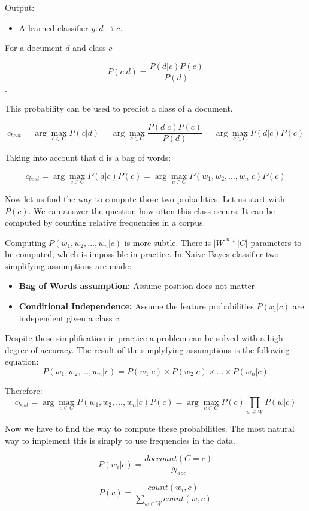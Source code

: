 \documentclass[12pt]{report}
\begin{document}
Output: 
\begin{itemize}
  \item A learned classifier $y: d \rightarrow c$.
\end{itemize}

For a document $d$ and class $c$

$$P(c | d) = \dfrac{P(d | c) P(c)}{P(d)}$$.

This probability can be used to predict a class of a document.

$$c_{best} = \arg\!\max_{c \in C} P(c | d) = \arg\!\max_{c \in C} \dfrac{P(d | c) P(c)}{P(d)} = \arg\!\max_{c \in C} {P(d | c) P(c)}$$

Taking into account that d is a bag of words:

$$c_{best} = \arg\!\max_{c \in C} {P(d | c) P(c)} = \arg\!\max_{c \in C} {P(w_1, w_2,..., w_n | c) P(c)}$$

Now let us find the way to compute those two probailities. Let us start with $P(c)$. We can answer the question how often this class occurs. It can be computed by counting relative frequencies in a corpus.

Computing $P(w_1, w_2,..., w_n | c)$ is more subtle. There is $|W|^n * |C|$ parameters to be computed, which is impossible in practice. In Naive Bayes classifier two simplifying assumptions are made:

\begin{itemize}
  \item \textbf{Bag of Words assumption:} Assume position does not matter
  \item \textbf{Conditional Independence:} Assume the feature probabilities $P(x_i | c)$ are independent given a class c.
\end{itemize}

Despite these simplification in practice a problem can be solved with a high degree of accuracy. The result of the simplyfying assumptions is the following equation:
$$P(w_1, w_2,..., w_n | c) = P(w_1 | c) \times P(w_2 | c) \times ... \times P(w_n | c)$$

Therefore:
$$c_{best} = \arg\!\max_{c \in C} {P(w_1, w_2,..., w_n | c) P(c)} = \arg\!\max_{c \in C} P(c) \prod_{w \in W} {P(w | c) }$$

Now we have to find the way to compute these probabilities. The most natural way to implement this is simply to use frequencies in the data.

$$P(w_i | c) = \dfrac{doccount(C=c)}{N_{doc}}$$

$$P(c) = \dfrac{count(w_i, c)}{\sum_{w \in W} {count(w, c)}}$$
\end{document}

